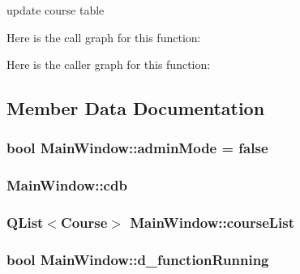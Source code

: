 update course table 



Here is the call graph for this function\+:




Here is the caller graph for this function\+:




\subsection{Member Data Documentation}
\hypertarget{class_main_window_af5c03c6632d910a4a733ff21f5613cc5}{}
\subsubsection[{admin\+Mode}]{\setlength{\rightskip}{0pt plus 5cm}bool Main\+Window\+::admin\+Mode = false\hspace{0.3cm}{\ttfamily [private]}}\label{class_main_window_af5c03c6632d910a4a733ff21f5613cc5}
\hypertarget{class_main_window_a38cdde30de1c2211dc81a739ed1af6aa}{}
\subsubsection[{cdb}]{ Main\+Window\+::cdb\hspace{0.3cm}{\ttfamily [private]}}\label{class_main_window_a38cdde30de1c2211dc81a739ed1af6aa}
\hypertarget{class_main_window_a0c800a8b8fe1c75097adf279dc1dfc85}{}
\subsubsection[{course\+List}]{\setlength{\rightskip}{0pt plus 5cm}Q\+List$<${\bf Course}$>$ Main\+Window\+::course\+List\hspace{0.3cm}{\ttfamily [private]}}\label{class_main_window_a0c800a8b8fe1c75097adf279dc1dfc85}
\hypertarget{class_main_window_af58e1c4e884964d4e4376c5bbbe5ef66}{}
\subsubsection[{d\+\_\+function\+Running}]{\setlength{\rightskip}{0pt plus 5cm}bool Main\+Window\+::d\+\_\+function\+Running\hspace{0.3cm}{\ttfamily [private]}}\label{class_main_window_af58e1c4e884964d4e4376c5bbbe5ef66}
\hypertarget{class_main_window_a96bf5b586be34a9e3a42cf556c089968}{}
